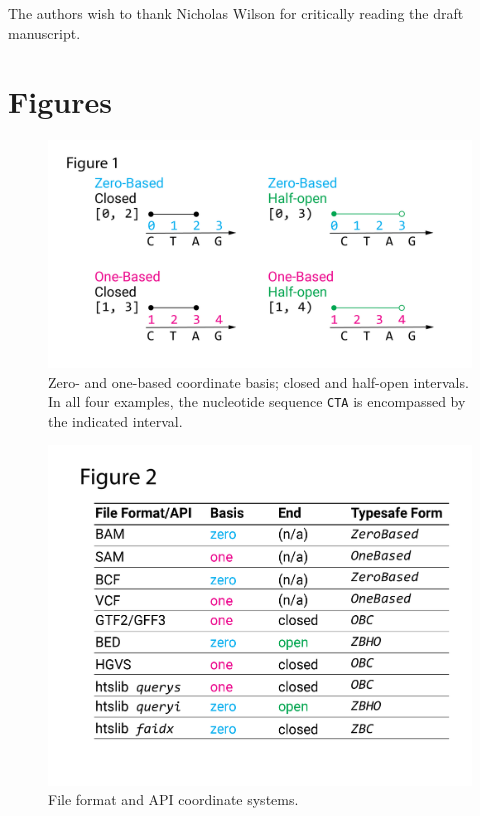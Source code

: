 \documentclass[12pt]{article}
\begin{document}
The authors wish to thank Nicholas Wilson for critically reading the draft manuscript.

\newpage
\printbibliography

\newpage
\section*{Figures}

\begin{figure}[h]
\includegraphics[width=\columnwidth]{coordsystems.png}
\caption{Zero- and one-based coordinate basis; closed and half-open intervals. In all four examples, the nucleotide sequence \texttt{CTA} is encompassed by the indicated interval.}
\label{fig:coordinatesystems}
\end{figure}


\begin{figure}[h] 
\includegraphics[width=\columnwidth]{formats.png}
\caption{File format and API coordinate systems.}
\label{fig:filesandapis}
\end{figure}
\end{document}
